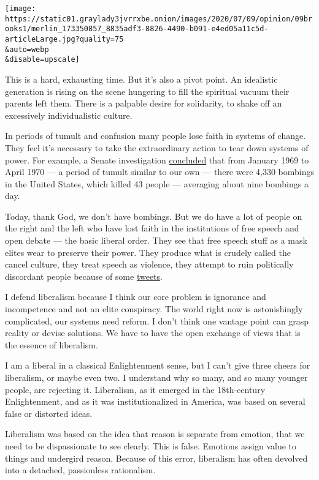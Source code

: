 \texttt{[image: https://static01.graylady3jvrrxbe.onion/images/2020/07/09/opinion/09brooks1/merlin\_173350857\_8835adf3-8826-4490-b091-e4ed05a11c5d-articleLarge.jpg?quality=75\\\&auto=webp\\\&disable=upscale]}

This is a hard, exhausting time. But it's also a pivot point. An
idealistic generation is rising on the scene hungering to fill the
spiritual vacuum their parents left them. There is a palpable desire for
solidarity, to shake off an excessively individualistic culture.

In periods of tumult and confusion many people lose faith in systems of
change. They feel it's necessary to take the extraordinary action to
tear down systems of power. For example, a Senate investigation
\href{https://cityroom.blogs.nytimes3xbfgragh.onion/2009/08/27/1969-a-year-of-bombings/}{concluded}
that from January 1969 to April 1970 --- a period of tumult similar to
our own --- there were 4,330 bombings in the United States, which killed
43 people --- averaging about nine bombings a day.

Today, thank God, we don't have bombings. But we do have a lot of people
on the right and the left who have lost faith in the institutions of
free speech and open debate --- the basic liberal order. They see that
free speech stuff as a mask elites wear to preserve their power. They
produce what is crudely called the cancel culture, they treat speech as
violence, they attempt to ruin politically discordant people because of
some
\href{https://twitter.com/sapinker/status/1279934082210816003?s=20}{tweets}.

I defend liberalism because I think our core problem is ignorance and
incompetence and not an elite conspiracy. The world right now is
astonishingly complicated, our systems need reform. I don't think one
vantage point can grasp reality or devise solutions. We have to have the
open exchange of views that is the essence of liberalism.

I am a liberal in a classical Enlightenment sense, but I can't give
three cheers for liberalism, or maybe even two. I understand why so
many, and so many younger people, are rejecting it. Liberalism, as it
emerged in the 18th-century Enlightenment, and as it was
institutionalized in America, was based on several false or distorted
ideas.

Liberalism was based on the idea that reason is separate from emotion,
that we need to be dispassionate to see clearly. This is false. Emotions
assign value to things and undergird reason. Because of this error,
liberalism has often devolved into a detached, passionless rationalism.

